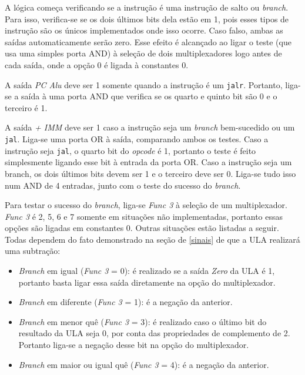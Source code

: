 \documentclass[twocolumn]{article}
\begin{document}
A lógica começa verificando se a instrução é uma instrução de salto ou
\textit{branch}. Para isso, verifica-se se os dois últimos bits dela estão em 1,
pois esses tipos de instrução são os únicos implementados onde isso
ocorre\cite{spec}. Caso falso, ambas as saídas automaticamente serão zero. Esse
efeito é alcançado ao ligar o teste (que usa uma simples porta AND) à seleção de
dois multiplexadores logo antes de cada saída, onde a opção 0 é ligada à
constantes 0.

A saída \textit{PC Alu} deve ser 1 somente quando a instrução é um
\verb|jalr|. Portanto, liga-se a saída à uma porta AND que verifica se os quarto
e quinto bit são 0 e o terceiro é 1.

A saída \textit{+ IMM} deve ser 1 caso a instrução seja um \textit{branch}
bem-sucedido ou um \verb|jal|. Liga-se uma porta OR à saída, comparando ambos os
testes. Caso a instrução seja \verb|jal|, o quarto bit do \textit{opcode} é 1,
portanto o teste é feito simplesmente ligando esse bit à entrada da porta
OR. Caso a instrução seja um branch, os dois últimos bits devem ser 1 e o
terceiro deve ser 0. Liga-se tudo isso num AND de 4 entradas, junto com o teste
do sucesso do \textit{branch}.

Para testar o sucesso do \textit{branch}, liga-se \textit{Func 3} à seleção de
um multiplexador. \textit{Func 3} é 2, 5, 6 e 7 somente em situações não
implementadas, portanto essas opções são ligadas em constantes 0. Outras
situações estão listadas a seguir. Todas dependem do fato demonstrado na seção
de \ref{sinais} de que a ULA realizará uma subtração:

\begin{itemize}
\item \textit{Branch} em igual (\textit{Func 3} = 0): é realizado se a saída
  \textit{Zero} da ULA é 1, portanto basta ligar essa saída diretamente na opção
  do multiplexador.
\item \textit{Branch} em diferente (\textit{Func 3} = 1): é a negação da
  anterior.
\item \textit{Branch} em menor quê (\textit{Func 3} = 3): é realizado caso o
  último bit do resultado da ULA seja 0, por conta das propriedades de
  complemento de 2\cite{cornell-notes}. Portanto liga-se a negação desse bit na
  opção do multiplexador.
\item \textit{Branch} em maior ou igual quê (\textit{Func 3} = 4): é a negação
  da anterior.
\end{itemize}

{}

\end{document}

